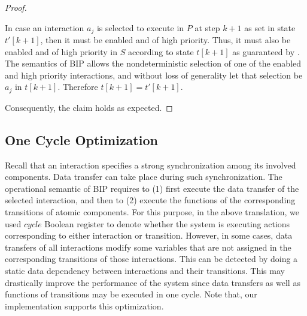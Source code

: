 \begin{proof}
\begin{itemize}
In case an interaction $a_j$ is selected to execute in $P$ at step $k+1$ as set in state $t'[k+1]$, 
then it must be enabled and of high priority.
Thus, it must also be enabled and of high priority in $S$ according to state $t[k+1]$
as guaranteed by . 
The semantics of BIP allows the nondeterministic selection of
one of the enabled and high priority interactions, and without loss of generality let that selection be $a_j$ in $t[k+1]$. 
Therefore $t[k+1]=t'[k+1]$. 
\end{itemize}
%
Consequently, the claim holds as expected. 
\end{proof}
%
\subsection{One Cycle Optimization}
%
Recall that an interaction specifies a strong synchronization among its involved components.
Data transfer can take place during such synchronization.
The operational semantic of BIP requires to (1) first execute the data transfer of the selected interaction, and then to (2) execute the functions of the corresponding transitions of atomic components.
For this purpose, in the above translation, we used $\mathit{cycle}$ Boolean register to denote whether the system is executing actions corresponding to either interaction or transition.
However, in some cases, data transfers of all interactions modify some variables that are not assigned in the corresponding transitions of those interactions.
This can be detected by doing a static data dependency between interactions and their transitions.
This may drastically improve the performance of the system since data transfers as well as functions of transitions may be executed in one cycle. Note that, our implementation supports this optimization.   
%